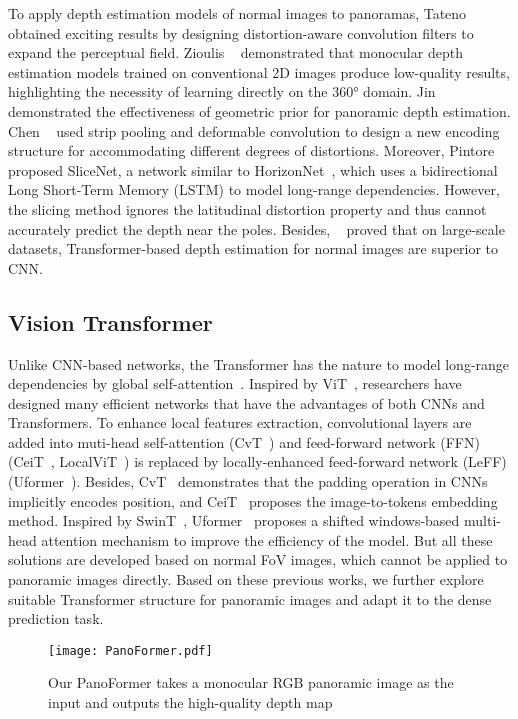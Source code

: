 \documentclass[runningheads]{llncs}
\begin{document}
 To apply depth estimation models of normal images to panoramas, Tateno ~\cite{tateno2018distortion} obtained exciting results by designing distortion-aware convolution filters to expand the perceptual field. 
 Zioulis ~\cite{zioulis2018omnidepth} demonstrated that monocular depth estimation models trained on conventional 2D images produce low-quality results, highlighting the necessity of learning directly on the 360° domain. Jin ~\cite{jin2020geometric} demonstrated the effectiveness of geometric prior for panoramic depth estimation. Chen ~\cite{chen2021distortion} used strip pooling and deformable convolution to design a new encoding structure for accommodating different degrees of distortions. Moreover, Pintore ~\cite{pintore2021slicenet} proposed SliceNet, a network similar to HorizonNet~\cite{sun2019horizonnet}, which uses a bidirectional Long Short-Term Memory (LSTM) to model long-range dependencies. However, the slicing method ignores the latitudinal distortion property and thus cannot accurately predict the depth near the poles. Besides, ~\cite{bhat2021adabins,dosovitskiy2020image} proved that on large-scale datasets, Transformer-based depth estimation for normal images are superior to CNN.

\subsection{Vision Transformer}
 Unlike CNN-based networks, the Transformer has the nature to model long-range dependencies by global self-attention~\cite{ranftl2021vision}. Inspired by ViT~\cite{dosovitskiy2020image}, researchers have designed many efficient networks that have the advantages of both CNNs and Transformers. To enhance local features extraction, convolutional layers are added into muti-head self-attention (CvT~\cite{wu2021cvt}) and feed-forward network (FFN)  (CeiT~\cite{yuan2021incorporating}, LocalViT~\cite{li2021localvit}) is replaced by locally-enhanced  feed-forward network (LeFF) (Uformer~\cite{wang2021uformer}). Besides, CvT~\cite{wu2021cvt} demonstrates that the padding operation in CNNs implicitly encodes position, and CeiT~\cite{yuan2021incorporating} proposes the image-to-tokens embedding method. Inspired by SwinT~\cite{liu2021swin}, Uformer~\cite{wang2021uformer} proposes a shifted windows-based multi-head attention mechanism to improve the efficiency of the model. But all these solutions are developed based on normal FoV images, which cannot be applied to panoramic images directly. Based on these previous works, we further explore suitable Transformer structure for panoramic images and adapt it to the dense prediction task.
\begin{figure}[t]
  \centering
  \texttt{[image: PanoFormer.pdf]} \caption{Our PanoFormer takes a monocular RGB panoramic image as the input and outputs the high-quality depth map} \label{fig:framework}
\end{figure}
\end{document}
